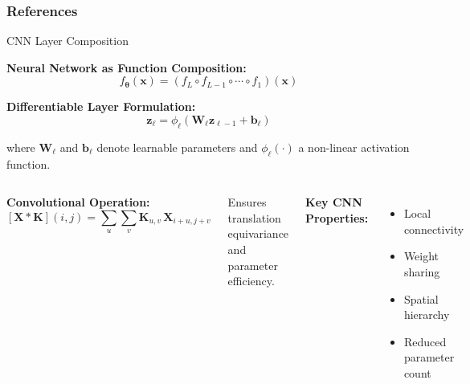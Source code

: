 \documentclass[aspectratio=169]{beamer}
\begin{document}
\begin{frame}[allowframebreaks]%
\frametitle{References}
{\tiny 


}

\end{frame}

\begin{frame}{CNN Layer Composition}

\textbf{Neural Network as Function Composition:}
\[
f_{\boldsymbol{\theta}}(\mathbf{x})
=
(f_L \circ f_{L-1} \circ \cdots \circ f_1)(\mathbf{x})
\]

\vspace{0.2cm}

\textbf{Differentiable Layer Formulation:}
\[
\mathbf{z}_\ell =
\phi_\ell(\mathbf{W}_\ell \mathbf{z}_{\ell-1} + \mathbf{b}_\ell)
\]

\small
where $\mathbf{W}_\ell$ and $\mathbf{b}_\ell$ denote learnable parameters and
$\phi_\ell(\cdot)$ a non-linear activation function.

\vspace{0.3cm}

\begin{columns}
\textbf{Convolutional Operation:}
\[
[\mathbf{X} * \mathbf{K}](i,j)
=
\sum_{u}\sum_{v}
\mathbf{K}_{u,v}\,
\mathbf{X}_{i+u,j+v}
\]

\small
Ensures translation equivariance and parameter efficiency.

\textbf{Key CNN Properties:}
\begin{itemize}
\item Local connectivity
\item Weight sharing
\item Spatial hierarchy
\item Reduced parameter count
\end{itemize}
\end{columns}

\vspace{0.2cm}

\end{frame}
\end{document}
